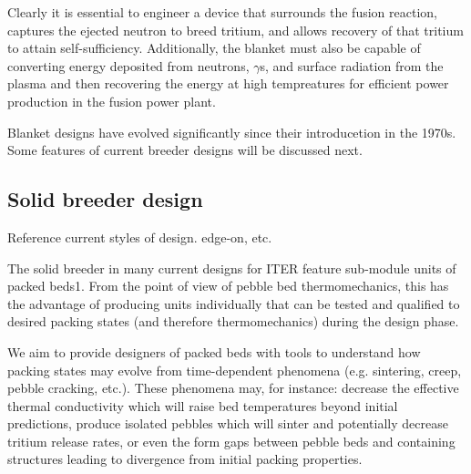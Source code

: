Clearly it is essential to engineer a device that surrounds the fusion reaction, captures the ejected neutron to breed tritium, and allows recovery of that tritium to attain self-sufficiency. Additionally, the blanket must also be capable of converting energy deposited from neutrons, $\gamma$s, and surface radiation from the plasma and then recovering the energy at high tempreatures for efficient power production in the fusion power plant.

Blanket designs have evolved significantly since their introducetion in the 1970s. Some features of current breeder designs will be discussed next.









\subsection{Solid breeder design}
Reference current styles of design. edge-on, etc.

The solid breeder in many current designs for ITER feature sub-module units of packed beds1. From the point of view of pebble bed thermomechanics, this has the advantage of producing units individually that can be tested and qualified to desired packing states (and therefore thermomechanics) during the design phase.

We aim to provide designers of packed beds with tools to understand how packing states may evolve from time-dependent phenomena (e.g. sintering, creep, pebble cracking, etc.). These phenomena may, for instance: decrease the effective thermal conductivity which will raise bed temperatures beyond initial predictions, produce isolated pebbles which will sinter and potentially decrease tritium release rates, or even the form gaps between pebble beds and containing structures leading to divergence from initial packing properties. 



